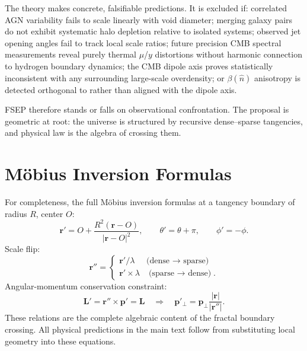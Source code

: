 \documentclass[11pt,letterpaper]{article}
\begin{document}
The theory makes concrete, falsifiable predictions. It is excluded if: correlated
AGN variability fails to scale linearly with void diameter; merging galaxy pairs do
not exhibit systematic halo depletion relative to isolated systems; observed jet
opening angles fail to track local scale ratios; future precision CMB spectral
measurements reveal purely thermal $\mu$/$y$ distortions without harmonic connection
to hydrogen boundary dynamics; the CMB dipole axis proves statistically inconsistent
with any surrounding large-scale overdensity; or $\beta(\hat{n})$ anisotropy is
detected orthogonal to rather than aligned with the dipole axis.

FSEP therefore stands or falls on observational confrontation. The proposal is
geometric at root: the universe is structured by recursive dense--sparse tangencies,
and physical law is the algebra of crossing them.

\appendix
\section{M\"obius Inversion Formulas}
\label{app:mobius}
For completeness, the full M\"obius inversion formulas at a tangency boundary of
radius $R$, center $O$:
\begin{equation}
\mathbf{r}'=O+\frac{R^2(\mathbf{r}-O)}{|\mathbf{r}-O|^2}, \qquad
\theta'=\theta+\pi, \qquad \phi'=-\phi.
\end{equation}
Scale flip:
\begin{equation}
\mathbf{r}''=
\begin{cases}
\mathbf{r}'/\lambda & \text{(dense $\to$ sparse)}\\
\mathbf{r}'\times\lambda & \text{(sparse $\to$ dense)}.
\end{cases}
\end{equation}
Angular-momentum conservation constraint:
\begin{equation}
\mathbf{L}'=\mathbf{r}''\times\mathbf{p}'=\mathbf{L}
\quad\Rightarrow\quad
\mathbf{p}'_\perp=\mathbf{p}_\perp\frac{|\mathbf{r}|}{|\mathbf{r}''|}.
\end{equation}
These relations are the complete algebraic content of the fractal boundary crossing.
All physical predictions in the main text follow from substituting local geometry
into these equations.
\end{document}

